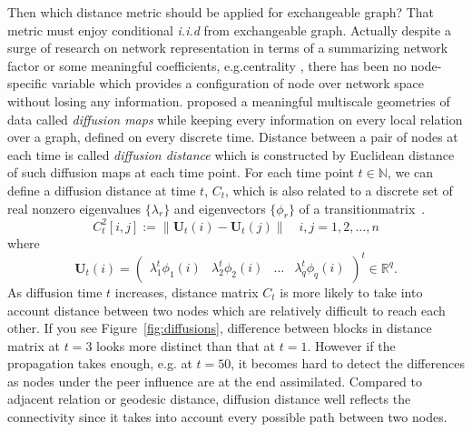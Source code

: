 \documentclass[12pt]{article}
\theoremstyle{definition}
\begin{document}
Then which distance metric should be applied for exchangeable graph? That metric must enjoy conditional \textit{i.i.d} from exchangeable graph. Actually despite a surge of research on network representation in terms of a summarizing network factor \citep{hoff2002latent} or some meaningful coefficients, e.g.centrality \citep{mantzaris2013dynamic, sporns2007identification}, there has been no node-specific variable which provides a configuration of node over network space without losing any information. \cite{coifman2006diffusion} proposed a meaningful multiscale geometries of data called \textit{diffusion maps} while keeping every information on every local relation over a graph, defined on every discrete time. Distance between a pair of nodes at each time is called \textit{diffusion distance} which is constructed by Euclidean distance of such diffusion maps at each time point. For each time point $t \in \mathbb{N}$, we can define a diffusion distance at time $t$, $C_{t}$, which is also related to a discrete set of real nonzero eigenvalues $\{ \lambda_{r} \}$ and eigenvectors $\{ \phi_{r}  \}$ of a transitionmatrix~\citep{coifman2006diffusion,lafon2006diffusion}. 
\begin{equation}
\label{eq:diffusion}
C^2_{t}[i,j]  :=   \parallel \mathbf{U}_{t}(i) - \mathbf{U}_{t}(j) \parallel   \quad i,j = 1,2, \ldots , n
\end{equation}
where 
\begin{equation} 
\mathbf{U}_{t}(i) = \begin{pmatrix} \lambda^{t}_{1} \phi_{1}(i) & \lambda^{t}_{2} \phi_{2} (i)  & \ldots & \lambda^{t}_{q} \phi_{q}(i) \end{pmatrix}^{t} \in \mathbb{R}^{q}.
\end{equation}
As diffusion time $t$ increases, distance matrix $C_{t}$ is more likely to take into account distance between two nodes which are relatively difficult to reach each other. If you see Figure~\ref{fig:diffusions}, difference between blocks in distance matrix at $t=3$ looks more distinct than that at $t=1$.  However if the propagation takes enough, e.g. at $t=50$, it becomes hard to detect the differences as nodes under the peer influence are at the end assimilated. Compared to adjacent relation or geodesic distance, diffusion distance well reflects the connectivity since it takes into account every possible path between two nodes. 
\end{document}

